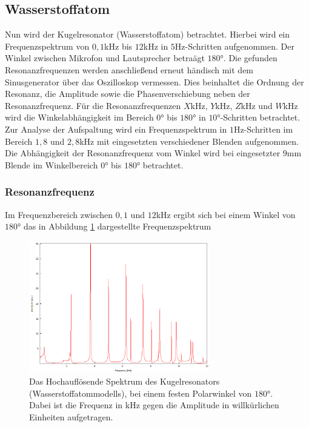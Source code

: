\subsection{Wasserstoffatom}
Nun wird der Kugelresonator (Wasserstoffatom) betrachtet. Hierbei wird ein Frequenzspektrum
von $0,1$kHz bis $12$kHz in $5$Hz-Schritten aufgenommen. Der Winkel zwischen Mikrofon und Lautsprecher betraägt $180°$.
Die gefunden Resonanzfrequenzen werden anschließend erneut händisch mit dem Sinusgenerator über das Oszilloskop vermessen.
Dies beinhaltet die Ordnung der Resonanz, die Amplitude sowie die Phasenverschiebung neben der Resonanzfrequenz.
Für die Resonanzfrequenzen $X$kHz, $Y$kHz, $Z$kHz und $W$kHz wird die Winkelabhängigkeit im Bereich $0°$ bis $180°$ in $10°$-Schritten betrachtet.\\
Zur Analyse der Aufspaltung wird ein Frequenzspektrum in $1$Hz-Schritten im Bereich $1,8$ und $2,8$kHz mit eingesetzten
verschiedener Blenden aufgenommen. Die Abhängigkeit der Resonanzfrequenz vom Winkel wird bei eingesetzter $9$mm Blende 
im Winkelbereich $0°$ bis $180°$ betrachtet.

\subsubsection*{Resonanzfrequenz}
Im Frequenzbereich zwischen $0,1$ und $12$kHz ergibt sich bei einem Winkel von $180°$ das in Abbildung \ref{fig:kugel_res}
dargestellte Frequenzspektrum

\begin{figure}
    \center
    \includegraphics[width=0.7\textwidth]{data/Wasserstoffatom/Ohne_Ring/Spektrum_180_first.png}%
    \caption{Das Hochauflösende Spektrum des Kugelresonators (Wasserstoffatommodells), bei einem 
    festen Polarwinkel von $180°$. Dabei ist die Frequenz in kHz gegen die Amplitude in willkürlichen Einheiten aufgetragen.}
    \label{fig:kugel_res}
\end{figure}

